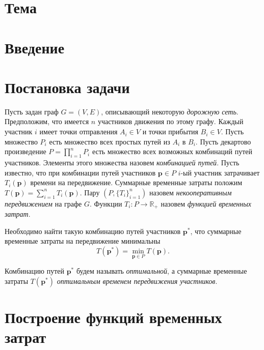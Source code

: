 \documentclass[12pt, a4paper]{article}
\DeclareMathOperator*{\minn}{min}
\begin{document}
\newpage
\pagestyle{plain}
\tableofcontents{}
\newpage	
	
 \section*{Тема}



\section{Введение}


\newpage
\section{Постановка задачи}

Пусть задан граф $G = (V, E)$, описывающий некоторую \textit{дорожную сеть}. Предположим, что имеется $n$ участников движения по этому графу. Каждый участник $i$ имеет точки отправления $A_i \in V$ и точки прибытия $B_i \in V$. Пусть множество $P_i$ есть множество всех простых путей из $A_i$ в $B_i$. Пусть декартово произведение ${P = \prod \limits_{i = 1} ^ n P_i}$ есть множество всех возможных комбинаций путей участников. Элементы этого множества назовем \textit{комбинацией путей}. Пусть известно, что при комбинации путей участников ${\textbf{p} \in P}$ $i$-ый участник затрачивает $T_i(\textbf{p})$ времени на передвижение. Суммарные временные затраты положим ${T(\textbf{p}) = \sum\limits_{i = 1}^n T_i (\textbf{p})}$. Пару $(P, \{T_i\}_{i = 1} ^ n)$ назовем \textit{некооперативным передвижением} на графе $G$. Функции ${T_i: P \rightarrow \mathbb{R}_+}$ назовем \textit{функцией временных затрат}.

Необходимо найти такую комбинацию путей участников $\textbf{p}^*$, что суммарные временные затраты на передвижение минимальны
\begin{equation}
\label{eq:target_task_T} 
T (\textbf{p}^*) = \minn\limits_{ \textbf{p} \in P} T (\textbf{p}).
\end{equation}
	
Комбинацию путей $\textbf{p}^*$ будем называть \textit {оптимальной}, а суммарные временные затраты  $ T (\textbf{p}^*)$ \textit {оптимальным временем передвижения участников}.

\newpage
\section{Построение функций временных затрат}
\end{document}
